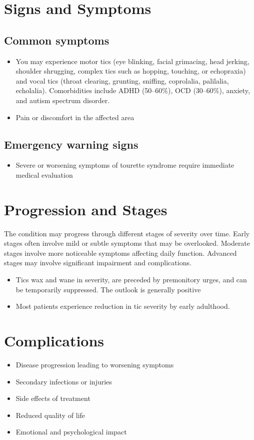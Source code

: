 \section{Signs and Symptoms}

\subsection{Common symptoms}
\begin{itemize}[noitemsep]
  \item You may experience motor tics (eye blinking, facial grimacing, head jerking, shoulder shrugging, complex tics such as hopping, touching, or echopraxia) and vocal tics (throat clearing, grunting, sniffing, coprolalia, palilalia, echolalia). Comorbidities include ADHD (50--60\%), OCD (30--60\%), anxiety, and autism spectrum disorder.

  \item Pain or discomfort in the affected area
  \end{itemize}

\subsection{Emergency warning signs}
\begin{itemize}[noitemsep]
  \item Severe or worsening symptoms of tourette syndrome require immediate medical evaluation
\end{itemize}
\section{Progression and Stages}
The condition may progress through different stages of severity over time. Early stages often involve mild or subtle symptoms that may be overlooked. Moderate stages involve more noticeable symptoms affecting daily function. Advanced stages may involve significant impairment and complications.

\begin{itemize}[noitemsep]
  \item Tics wax and wane in severity, are preceded by premonitory urges, and can be temporarily suppressed. The outlook is generally positive
  \item Most patients experience reduction in tic severity by early adulthood.
\end{itemize}
\section{Complications}
\begin{itemize}[noitemsep]
  \item Disease progression leading to worsening symptoms
  \item Secondary infections or injuries
  \item Side effects of treatment
  \item Reduced quality of life
  \item Emotional and psychological impact
\end{itemize}
